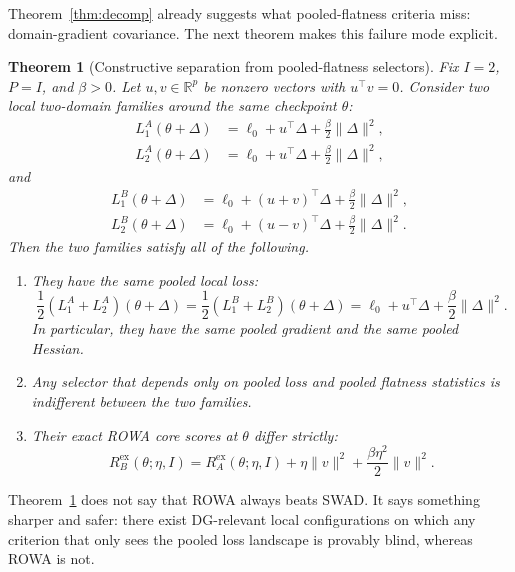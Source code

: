 \documentclass{article}
\newtheorem{theorem}{Theorem}
\newcommand{\RR}{\mathbb{R}}
\newcommand{\rowa}{\textup{\textsc{ROWA}}}
\newcommand{\swad}{\textup{\textsc{SWAD}}}
\begin{document}
Theorem~\ref{thm:decomp} already suggests what pooled-flatness criteria miss: domain-gradient covariance. The next theorem makes this failure mode explicit.

\begin{theorem}[Constructive separation from pooled-flatness selectors]
\label{thm:separation}
Fix $I=2$, $P=I$, and $\beta > 0$. Let $u,v \in \RR^p$ be nonzero vectors with $u^\top v = 0$. Consider two local two-domain families around the same checkpoint $\theta$:
\begin{align}
    L_1^{A}(\theta+\Delta) &= \ell_0 + u^\top \Delta + \frac{\beta}{2}\|\Delta\|^2,\\
    L_2^{A}(\theta+\Delta) &= \ell_0 + u^\top \Delta + \frac{\beta}{2}\|\Delta\|^2,
\end{align}
and
\begin{align}
    L_1^{B}(\theta+\Delta) &= \ell_0 + (u+v)^\top \Delta + \frac{\beta}{2}\|\Delta\|^2,\\
    L_2^{B}(\theta+\Delta) &= \ell_0 + (u-v)^\top \Delta + \frac{\beta}{2}\|\Delta\|^2.
\end{align}
Then the two families satisfy all of the following.
\begin{enumerate}[label=(\roman*), leftmargin=1.5em]
    \item They have the same pooled local loss:
    \begin{equation}
        \frac{1}{2}(L_1^{A}+L_2^{A})(\theta+\Delta) = \frac{1}{2}(L_1^{B}+L_2^{B})(\theta+\Delta)
        = \ell_0 + u^\top \Delta + \frac{\beta}{2}\|\Delta\|^2.
    \end{equation}
    In particular, they have the same pooled gradient and the same pooled Hessian.
    \item Any selector that depends only on pooled loss and pooled flatness statistics is indifferent between the two families.
    \item Their exact \rowa{} core scores at $\theta$ differ strictly:
    \begin{equation}
        R^{\mathrm{ex}}_{B}(\theta;\eta,I)
        =
        R^{\mathrm{ex}}_{A}(\theta;\eta,I)
        +
        \eta \|v\|^2
        +
        \frac{\beta \eta^2}{2}\|v\|^2.
        \label{eq:strict_gap}
    \end{equation}
\end{enumerate}
\end{theorem}

Theorem~\ref{thm:separation} does not say that \rowa{} always beats \swad{}. It says something sharper and safer: there exist DG-relevant local configurations on which any criterion that only sees the pooled loss landscape is provably blind, whereas \rowa{} is not.
\end{document}

